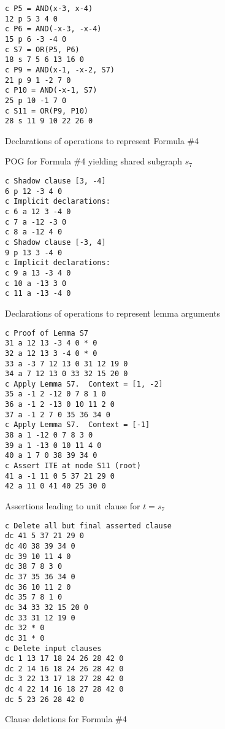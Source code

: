 \documentclass{llncs}
\begin{document}
\begin{figure}
\begin{verbatim}
c P5 = AND(x-3, x-4)
12 p 5 3 4 0
c P6 = AND(-x-3, -x-4)
15 p 6 -3 -4 0
c S7 = OR(P5, P6)
18 s 7 5 6 13 16 0
c P9 = AND(x-1, -x-2, S7)
21 p 9 1 -2 7 0
c P10 = AND(-x-1, S7)
25 p 10 -1 7 0
c S11 = OR(P9, P10)
28 s 11 9 10 22 26 0
\end{verbatim}
\caption{Declarations of operations to represent Formula \#4}
\label{fig:eg4:ops}
\end{figure}

\begin{figure}
  \centering{
    \centering{}
  }
\caption{POG for Formula \#4 yielding shared subgraph $s_7$}
\label{fig:eg4:pog}
\end{figure}

\begin{figure}
\begin{verbatim}
c Shadow clause [3, -4]
6 p 12 -3 4 0
c Implicit declarations:
c 6 a 12 3 -4 0
c 7 a -12 -3 0
c 8 a -12 4 0
c Shadow clause [-3, 4]
9 p 13 3 -4 0
c Implicit declarations:
c 9 a 13 -3 4 0
c 10 a -13 3 0
c 11 a -13 -4 0
\end{verbatim}
\caption{Declarations of operations to represent lemma arguments}
\label{fig:eg4:args}
\end{figure}


\begin{figure}
\begin{verbatim}
c Proof of Lemma S7
31 a 12 13 -3 4 0 * 0
32 a 12 13 3 -4 0 * 0
33 a -3 7 12 13 0 31 12 19 0
34 a 7 12 13 0 33 32 15 20 0
c Apply Lemma S7.  Context = [1, -2]
35 a -1 2 -12 0 7 8 1 0
36 a -1 2 -13 0 10 11 2 0
37 a -1 2 7 0 35 36 34 0
c Apply Lemma S7.  Context = [-1]
38 a 1 -12 0 7 8 3 0
39 a 1 -13 0 10 11 4 0
40 a 1 7 0 38 39 34 0
c Assert ITE at node S11 (root)
41 a -1 11 0 5 37 21 29 0
42 a 11 0 41 40 25 30 0
\end{verbatim}
\caption{Assertions leading to unit clause for $t=s_7$}
\label{fig:eg4:assert}
\end{figure}

\begin{figure}
\begin{verbatim}
c Delete all but final asserted clause
dc 41 5 37 21 29 0
dc 40 38 39 34 0
dc 39 10 11 4 0
dc 38 7 8 3 0
dc 37 35 36 34 0
dc 36 10 11 2 0
dc 35 7 8 1 0
dc 34 33 32 15 20 0
dc 33 31 12 19 0
dc 32 * 0
dc 31 * 0
c Delete input clauses
dc 1 13 17 18 24 26 28 42 0
dc 2 14 16 18 24 26 28 42 0
dc 3 22 13 17 18 27 28 42 0
dc 4 22 14 16 18 27 28 42 0
dc 5 23 26 28 42 0
\end{verbatim}
\caption{Clause deletions for Formula \#4}
\label{fig:eg4:delete}
\end{figure}





\end{document}
